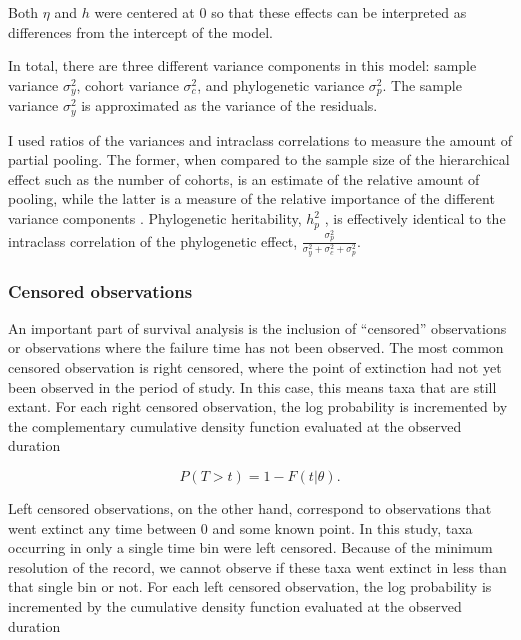\documentclass[12pt,letterpaper]{article}
\begin{document}
Both \(\eta\) and \(h\) were centered at 0 so that these effects can be interpreted as differences from the intercept of the model. 

In total, there are three different variance components in this model: sample variance \(\sigma_{y}^{2}\), cohort variance \(\sigma_{c}^{2}\), and phylogenetic variance \(\sigma_{p}^{2}\). The sample variance \(\sigma_{y}^{2}\) is approximated as the variance of the residuals.

I used ratios of the variances and intraclass correlations to measure the amount of partial pooling. The former, when compared to the sample size of the hierarchical effect such as the number of cohorts, is an estimate of the relative amount of pooling, while the latter is a measure of the relative importance of the different variance components \citep{Gelman2007}. Phylogenetic heritability, \(h_{p}^{2}\) \citet{Housworth2004}, is effectively identical to the intraclass correlation of the phylogenetic effect, \(\frac{\sigma_{p}^{2}}{\sigma_{y}^{2} + \sigma_{c}^{2} + \sigma_{p}^{2}}\).



\subsubsection{Censored observations}

An important part of survival analysis is the inclusion of ``censored'' observations \citep{Ibrahim2001,Kleinbaum2005} or observations where the failure time has not been observed. The most common censored observation is right censored, where the point of extinction had not yet been observed in the period of study. In this case, this means taxa that are still extant. For each right censored observation, the log probability is incremented by the complementary cumulative density function evaluated at the observed duration

\begin{equation}
  P(T > t) = 1 - F(t | \theta).
  \label{eq:right}
\end{equation}

Left censored observations, on the other hand, correspond to observations that went extinct any time between 0 and some known point. In this study, taxa occurring in only a single time bin were left censored. Because of the minimum resolution of the record, we cannot observe if these taxa went extinct in less than that single bin or not. For each left censored observation, the log probability is incremented by the cumulative density function evaluated at the observed duration
\end{document}
